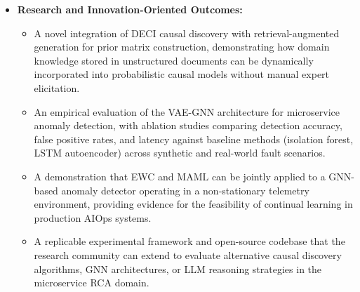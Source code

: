 \begin{itemize}
    \item \textbf{Research and Innovation-Oriented Outcomes:}
    \begin{itemize}
        \item A novel integration of DECI causal discovery with retrieval-augmented generation for prior matrix construction, demonstrating how domain knowledge stored in unstructured documents can be dynamically incorporated into probabilistic causal models without manual expert elicitation.
        \item An empirical evaluation of the VAE-GNN architecture for microservice anomaly detection, with ablation studies comparing detection accuracy, false positive rates, and latency against baseline methods (isolation forest, LSTM autoencoder) across synthetic and real-world fault scenarios.
        \item A demonstration that EWC and MAML can be jointly applied to a GNN-based anomaly detector operating in a non-stationary telemetry environment, providing evidence for the feasibility of continual learning in production AIOps systems.
        \item A replicable experimental framework and open-source codebase that the research community can extend to evaluate alternative causal discovery algorithms, GNN architectures, or LLM reasoning strategies in the microservice RCA domain.
    \end{itemize}

\end{itemize}
